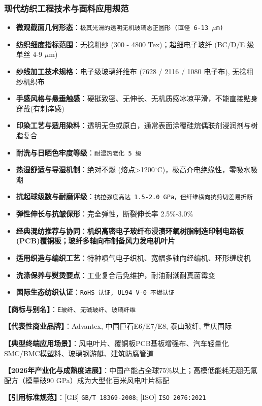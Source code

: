 \documentclass[11pt,openright,twoside,UTF8]{ctexbook}
\begin{document}
\subsubsection*{现代纺织工程技术与面料应用规范}
\begin{itemize} \setlength{\itemsep}{2pt}
    \item \textbf{微观截面几何形态}：\texttt{极其光滑的透明无机玻璃态正圆形 (直径 6-13 $\mu$m)}
    \item \textbf{纺织细度指标范围}：无捻粗纱 (300 - 4800 Tex)；超细电子玻纤 (BC/D/E 级单丝 4-9 $\mu$m)
    \item \textbf{纱线加工技术规格}：电子级玻璃纤维布 (7628 / 2116 / 1080 电子布), 无捻粗纱机织布
    \item \textbf{手感风格与悬垂触感}：硬挺致密、无伸长、无机质感冰凉平滑，不能直接贴身穿戴(有刺痒感)
    \item \textbf{印染工艺与适用染料}：透明无色或原白，通常表面涂覆硅烷偶联剂浸润剂与树脂复合
    \item \textbf{耐洗与日晒色牢度等级}：\texttt{耐湿热老化 5 级}
    \item \textbf{热湿舒适与导湿机制}：绝对不燃 (熔点\textgreater{}1200$^\circ\mathrm{C}$)，极高介电绝缘性，零吸水吸潮
    \item \textbf{抗起球级数与耐磨评级}：\texttt{抗拉强度高达 1.5-2.0 GPa，但纤维横向抗剪切差易折断}
    \item \textbf{弹性伸长与抗皱保形}：完全弹性，断裂伸长率 2.5\%-3.0\%
    \item \textbf{经典混纺推荐与协同}：\textbf{机织高密电子玻纤布浸渍环氧树脂制造印制电路板(PCB)覆铜板；玻纤多轴向布制备风力发电机叶片}
    \item \textbf{适用织造与编织工艺}：特种喷气电子织机、宽幅多轴向经编机、环形缠绕机
    \item \textbf{洗涤保养与熨烫要点}：工业复合后免维护，耐油耐潮耐真菌霉变
    \item \textbf{国际生态纺织认证}：\texttt{RoHS 认证, UL94 V-0 不燃认证}
\end{itemize}
\vspace{0.2cm}

\noindent\textbf{【商标与别名】}：\texttt{E玻纤}、\texttt{无碱玻纤}、\texttt{玻璃纤维}\par
\noindent\textbf{【代表性商业品牌】}：Advantex, 中国巨石E6/E7/E8, 泰山玻纤, 重庆国际\par
\noindent\textbf{【典型终端应用场景】}：风电叶片、覆铜板PCB基板增强布、汽车轻量化SMC/BMC模塑料、玻璃钢游艇、建筑防腐管道\par
\noindent\textbf{【2026年产业化与成熟度进展】}：中国产能占全球75\%以上；高模低能耗无硼无氟配方（模量破90 GPa）成为大型化百米风电叶片标配\par
\noindent\textbf{【引用标准规范】}：[GB] \texttt{GB/T 18369-2008}; [ISO] \texttt{ISO 2076:2021}\par
\vspace{0.5cm}
\end{document}
